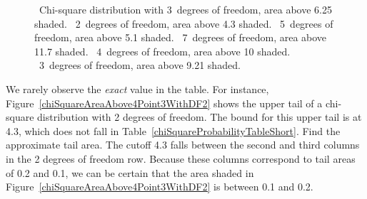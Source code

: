 \begin{figure}
{}
\caption{
\textbf{}~Chi-square distribution with 3~degrees of freedom, area above 6.25 shaded.
\textbf{}~2~degrees of freedom, area above 4.3 shaded.
\textbf{}~5~degrees of freedom, area above 5.1 shaded.
\textbf{}~7~degrees of freedom, area above 11.7 shaded.
\textbf{}~4~degrees of freedom, area above 10 shaded.
\textbf{}~3~degrees of freedom, area above 9.21 shaded.
}
\label{arrayOfFigureAreasForChiSquareDistribution}
\end{figure}

\begin{example}{We rarely observe the \emph{exact} value in the table. For instance, Figure~\ref{chiSquareAreaAbove4Point3WithDF2} shows the upper tail of a chi-square distribution with 2 degrees of freedom. The bound for this upper tail is at 4.3, which does not fall in Table~\ref{chiSquareProbabilityTableShort}. Find the approximate tail area.}
The cutoff 4.3 falls between the second and third columns in the 2 degrees of freedom row. Because these columns correspond to tail areas of 0.2 and 0.1, we can be certain that the area shaded in Figure~\ref{chiSquareAreaAbove4Point3WithDF2} is between 0.1 and 0.2.
\end{example}

